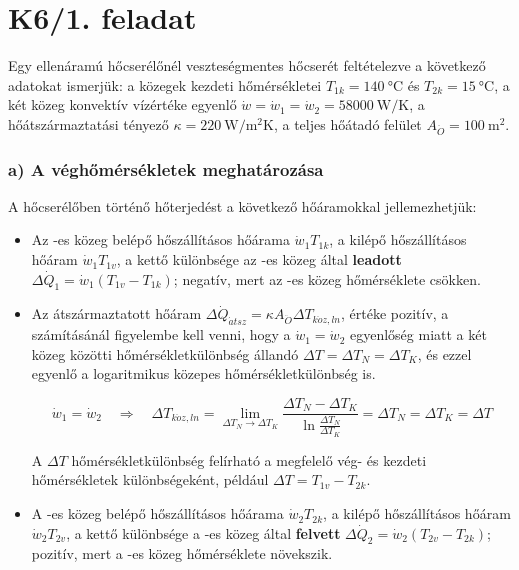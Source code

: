 

\section*{K6/1. feladat}
Egy ellenáramú hőcserélőnél veszteségmentes hőcserét feltételezve a következő adatokat ismerjük: a közegek kezdeti hőmérsékletei $T_{1k} = \SI{140}{\celsius}$ és $T_{2k} = \SI{15}{\celsius}$, a két közeg konvektív vízértéke egyenlő $\dot{w} = \dot{w}_1 = \dot{w}_2 = \SI{58000}{\watt\per\kelvin}$, a hőátszármaztatási tényező $\kappa = \SI{220}{\watt\per\meter\squared\kelvin}$, a teljes hőátadó felület $A_{\ddot{O}} = \SI{100}{\meter\squared}$.

\subsubsection*{a) A véghőmérsékletek meghatározása}
A hőcserélőben történő hőterjedést a következő hőáramokkal jellemezhetjük:
\begin{itemize}
	\setlength\itemsep{0em}
	\item Az -es közeg belépő hőszállításos hőárama $\dot{w}_1 T_{1k}$, a kilépő hőszállításos hőáram $\dot{w}_1 T_{1v}$, a kettő különbsége az -es közeg által \textbf{leadott} $\Delta \dot{Q}_1 = \dot{w}_1 \left(T_{1v} - T_{1k}\right)$; negatív, mert az -es közeg hőmérséklete csökken.
	\item Az átszármaztatott hőáram $\Delta \dot{Q}_{\acute{a}tsz} = \kappa A_{\ddot{O}} \Delta T_{k\ddot{o}z,ln}$, értéke pozitív, a számításánál figyelembe kell venni, hogy a $\dot{w}_1 = \dot{w}_2$ egyenlőség miatt a két közeg közötti hőmérsékletkülönbség állandó $\Delta T = \Delta T_N = \Delta T_K$, és ezzel egyenlő a logaritmikus közepes hőmérsékletkülönbség is.
	
	\begin{equation}
		\dot{w}_1 = \dot{w}_2 \quad \Rightarrow \quad \Delta T_{k\ddot{o}z,ln} = \lim_{\Delta T_N \to \Delta T_K} \dfrac{\Delta T_N - \Delta T_K}{\ln\frac{\Delta T_N}{\Delta T_K}} = \Delta T_N = \Delta T_K = \Delta T
	\end{equation}
	
	A $\Delta T$ hőmérsékletkülönbség felírható a megfelelő vég- és kezdeti hőmérsékletek különbségeként, például $\Delta T = T_{1v} - T_{2k}$.
	
	\item A -es közeg belépő hőszállításos hőárama $\dot{w}_2 T_{2k}$, a kilépő hőszállításos hőáram $\dot{w}_2 T_{2v}$, a kettő különbsége a -es közeg által \textbf{felvett} $\Delta \dot{Q}_2 = \dot{w}_2 \left(T_{2v} - T_{2k}\right)$; pozitív, mert a -es közeg hőmérséklete növekszik.
\end{itemize}

